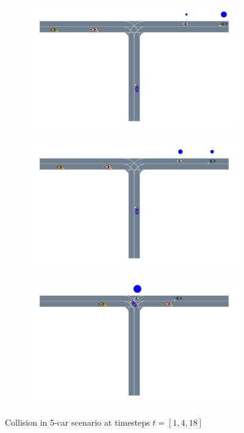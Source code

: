 \begin{figure}
    \centering
   \begin{subfigure}[t]{0.7\textwidth}
        \centering
        \includegraphics[width=\textwidth, trim={2cm 5cm 1cm 0},clip]{figures/scene_decomposition/f1_1.pdf}
    \end{subfigure}
    \begin{subfigure}[t]{0.7\textwidth}
        \centering
        \includegraphics[width=\textwidth, trim={2cm 5cm 1cm 0},clip]{figures/scene_decomposition/f1_4.pdf}
    \end{subfigure}
    \begin{subfigure}[t]{0.7\textwidth}
    \centering
    \includegraphics[width=\textwidth, trim={2cm 5cm 1cm 0},clip]{figures/scene_decomposition/f1_18.pdf}
\end{subfigure}
    \caption{Collision in 5-car scenario at timesteps $t=[1,4,18]$}
    \label{fig:two_car_collision}
    \vspace{-0.2in}
\end{figure}


